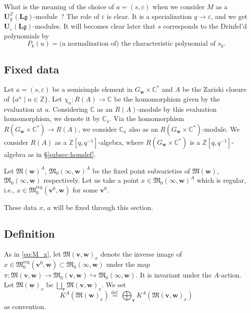 \documentclass[12pt]{amsart}
\def\Bbb{\mathbb}
\def\frak{\mathfrak}
\theoremstyle{definition}
\theoremstyle{remark}
\numberwithin{equation}{subsection}
\newcommand{\subsecref}[1]{\S\ref{#1}}
\newcommand{\defeq}{\overset{\operatorname{\scriptstyle def.}}{=}}
\newcommand{\C}{{\Bbb C}}
\newcommand{\Z}{{\Bbb Z}}
\newcommand{\M}{{\frak M}} %
\newcommand{\bv}{{\mathbf v}} %
\newcommand{\bw}{{\mathbf w}} %
\newcommand{\Uli}{{\mathbf U}^{\Z}_q({\mathbf L}\mathfrak g)}
\newcommand{\Ule}{{\mathbf U}_{\varepsilon}({\mathbf L}\mathfrak g)}
\newcommand{\Mw}{\M(\bw)}
\begin{document}
What is the meaning of the choice of $a = (s,\varepsilon)$ when we
consider $M$ as a $\Uli$-module~?
%
The role of $\varepsilon$ is clear. It is a specialization $q \to
\varepsilon$, and we get $\Ule$-modules. It will becomes clear later
that $s$ corresponds to the Drinfel'd polynomials by
\begin{equation*}
   P_k(u) = \text{(a normalization of) the characteristic polynomial
   of $s_k$}.
\end{equation*}

\subsection{Fixed data}

Let $a = (s,\varepsilon)$ be a semisimple element in $G_\bw\times
\C^*$ and $A$ be the Zariski closure of $\{ a^n \mid n\in\Z\}$.
Let $\chi_a\colon R(A) \to \C$ be the homomorphism given by the
evaluation at $a$. Considering $\C$ as an $R(A)$-module by this
evaluation homomorphism, we denote it by $\C_a$.
%
Via the homomorphism $R(G_\bw\times\C^*)\to R(A)$, we consider $\C_a$
also as an $R(G_\bw\times\C^*)$-module.
We consider $R(A)$ as a $\Z[q,q^{-1}]$-algebra, where
$R(G_\bw\times\C^*)$ is a $\Z[q,q^{-1}]$-algebra as in
\subsecref{subsec:homdef}.

Let $\M(\bw)^A$, $\M_0(\infty,\bw)^A$ be the fixed point subvarieties
of $\M(\bw)$, $\M_0(\infty,\bw)$ respectively.
%
Let us take a point $x\in \M_0(\infty,\bw)^A$ which is regular, i.e.,
$x\in \M_0^{\operatorname{reg}}(\bv^0,\bw)$ for some $\bv^0$.

These data $x$, $a$ will be fixed through this section.

\subsection{Definition}
As in \eqref{eq:M_x}, let $\M(\bv,\bw)_x$ denote the inverse image of
$x\in \M_0^{\operatorname{reg}}(\bv^0,\bw)\subset
\M_0(\infty,\bw)$ under the map
$\pi\colon \M(\bv,\bw)\to \M_0(\bv,\bw)\hookrightarrow
\M_0(\infty,\bw)$.
It is invariant under the $A$-action.
Let $\Mw_x$ be $\bigsqcup_\bv \M(\bv,\bw)_x$. We set
\begin{equation*}
    K^A(\Mw_x) \defeq \bigoplus_\bv K^A(\M(\bv,\bw)_x)
\end{equation*}
as convention.
\end{document}
